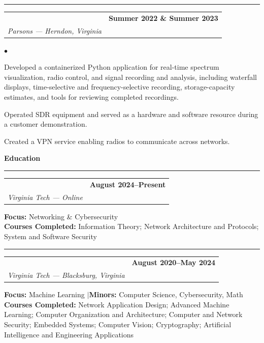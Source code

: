 \documentclass[10pt,letterpaper]{article}
\makeatletter
\newcommand{\sectiontitle}[1]{%
  \vspace{1.05em}%
  {\Large\bfseries\color{accent} #1}\par
  \vspace{0.25em}\hrule\vspace{0.5em}%
}
\newcommand{\entry}[4]{%
  \begin{tabularx}{\textwidth}{@{}>{\raggedright\arraybackslash}X>{\raggedleft\arraybackslash}p{2.05in}@{}}
    {\large\bfseries #1} & \textbf{#2} \\
    \textit{#3} & \textit{#4}
  \end{tabularx}\vspace{0.18em}%
}
\newenvironment{compactitems}{%
  \begin{list}{$\bullet$}{%
    \setlength{\leftmargin}{1.1em}%
    \setlength{\itemindent}{0pt}%
    \setlength{\itemsep}{0.2em}%
    \setlength{\parsep}{0pt}%
    \setlength{\topsep}{0.25em}%
  }%
}{\end{list}}
\makeatother
\begin{document}
\vspace{0.7em}
{\color{muted!35}\hrule}
\vspace{0.7em}
\entry{DSP Software Intern}{Summer 2022 \& Summer 2023}{Parsons --- Herndon, Virginia}{}
\begin{compactitems}
  \item Developed a containerized Python application for real-time spectrum visualization, radio control, and signal recording and analysis, including waterfall displays, time-selective and frequency-selective recording, storage-capacity estimates, and tools for reviewing completed recordings.
  \item Operated SDR equipment and served as a hardware and software resource during a customer demonstration.
  \item Created a VPN service enabling radios to communicate across networks.
\end{compactitems}

\sectiontitle{Education}
\entry{Master of Science in Computer Engineering}{August 2024--Present}{Virginia Tech --- Online}{}
\textbf{Focus:} Networking \& Cybersecurity\\
\textbf{Courses Completed:} Information Theory; Network Architecture and Protocols; System and Software Security

\vspace{0.7em}
{\color{muted!35}\hrule}
\vspace{0.7em}
\entry{Bachelor of Science in Computer Engineering}{August 2020--May 2024}{Virginia Tech --- Blacksburg, Virginia}{}
\textbf{Focus:} Machine Learning \enspace$\vert$\enspace \textbf{Minors:} Computer Science, Cybersecurity, Math\\
\textbf{Courses Completed:} Network Application Design; Advanced Machine Learning; Computer Organization and Architecture; Computer and Network Security; Embedded Systems; Computer Vision; Cryptography; Artificial Intelligence and Engineering Applications
\end{document}
